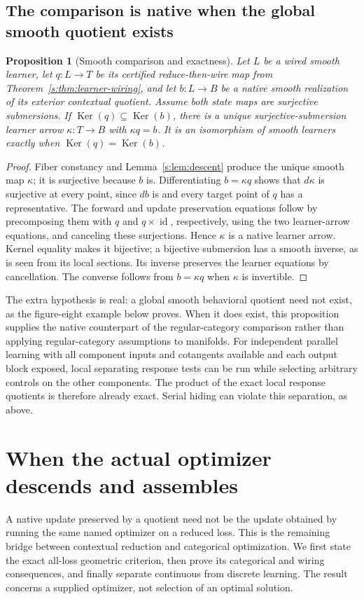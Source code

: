 \documentclass[11pt]{article}
\newtheorem{proposition}[theorem]{Proposition}
\theoremstyle{definition}
\theoremstyle{remark}\newtheorem{remark}[theorem]{Remark}
\newcommand{\id}{\operatorname{id}}
\newcommand{\Ker}{\operatorname{Ker}}
\begin{document}
\subsection{The comparison is native when the global smooth quotient exists}
\begin{proposition}[Smooth comparison and exactness]
\label{s:prop:smooth-comparison}
Let $L$ be a wired smooth learner, let $q:L\to T$ be its certified
reduce-then-wire map from Theorem~\ref{s:thm:learner-wiring}, and let
$b:L\to B$ be a native smooth realization of its exterior contextual
quotient. Assume both state maps are surjective submersions. If
$\Ker(q)\subseteq\Ker(b)$, there is a unique surjective-submersion learner
arrow $\kappa:T\to B$ with $\kappa q=b$. It is an isomorphism of smooth
learners exactly when $\Ker(q)=\Ker(b)$.
\end{proposition}
\begin{proof}
Fiber constancy and Lemma~\ref{s:lem:descent} produce the unique smooth
map $\kappa$; it is surjective because $b$ is. Differentiating
$b=\kappa q$ shows that $d\kappa$ is surjective at every point, since
$db$ is and every target point of $q$ has a representative. The forward
and update preservation equations follow by precomposing them with $q$
and $q\times\id$, respectively, using the two learner-arrow equations,
and canceling these surjections. Hence $\kappa$ is a native learner arrow.
Kernel equality makes it bijective; a bijective submersion has a smooth
inverse, as is seen from its local sections. Its inverse preserves the
learner equations by cancellation. The converse follows from
$b=\kappa q$ when $\kappa$ is invertible.
\end{proof}
The extra hypothesis is real: a global smooth behavioral quotient need
not exist, as the figure-eight example below proves. When it does exist,
this proposition supplies the native counterpart of the regular-category
comparison rather than applying regular-category assumptions to manifolds.
For independent parallel learning with all component inputs and cotangents
available and each output block exposed, local separating response tests
can be run while selecting arbitrary controls on the other components.
The product of the exact local response quotients is therefore already
exact. Serial hiding can violate this separation, as above.



\section{When the actual optimizer descends and assembles}
\label{sec:gradient}
A native update preserved by a quotient need not be the update obtained by
running the same named optimizer on a reduced loss. This is the remaining
bridge between contextual reduction and categorical optimization. We first
state the exact all-loss geometric criterion, then prove its categorical
and wiring consequences, and finally separate continuous from discrete
learning. The result concerns a supplied optimizer, not selection of an
optimal solution.
\end{document}
